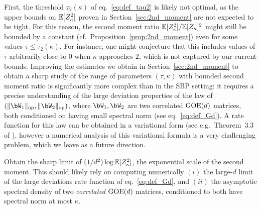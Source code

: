 \myskip
First, the threshold $\tau_2(\kappa)$ of eq.~\eqref{eq:def_tau2} is likely not optimal, 
as the upper bounds on $\mathbb{E}[Z_\kappa^2]$ proven in Section~\ref{sec:2nd_moment} are not expected to be tight.
For this reason, the second moment ratio $\mathbb{E}[Z_\kappa^2]/\mathbb{E}[Z_\kappa]^2$ might still be bounded by a constant (cf.\ Proposition~\ref{prop:2nd_moment}) even for some values $\tau \leq \tau_2(\kappa)$. 
For instance, one might conjecture that this includes values of $\tau$ arbitrarily close to $0$ when $\kappa$ approaches $2$, which is not captured by our current bounds.
Improving the estimates we obtain in Section~\ref{sec:2nd_moment} to obtain a sharp study of the range of parameters $(\tau, \kappa)$ with bounded second moment ratio is significantly more complex than in the SBP setting:
it requires a precise understanding of the large deviation properties of the law of $(\|\bW_1\|_\op, \|\bW_2\|_\op)$, where $\bW_1, \bW_2$ are two correlated $\mathrm{GOE}(d)$ matrices, both conditioned on having small spectral norm (see eq.~\eqref{eq:def_Gd}). 
A rate function for this law can be obtained in a variational form (see e.g.\ Theorem~3.3 of \cite{guionnet2004first}), however a numerical analysis of this variational formula 
is a very challenging problem, which we leave as a future direction.
\begin{openquestion}\label{op:sharp_2nd_mom}
    Obtain the sharp limit of $(1/d^2) \log \mathbb{E}[Z_\kappa^2]$, the exponential scale of the second moment.
    This should likely rely on computing numerically $(i)$ the large-$d$ limit of the large deviations rate function of eq.~\eqref{eq:def_Gd}, 
    and $(ii)$ the asymptotic spectral density of two \emph{correlated} $\mathrm{GOE}(d)$ matrices, conditioned to both have spectral norm at most $\kappa$.
\end{openquestion}

